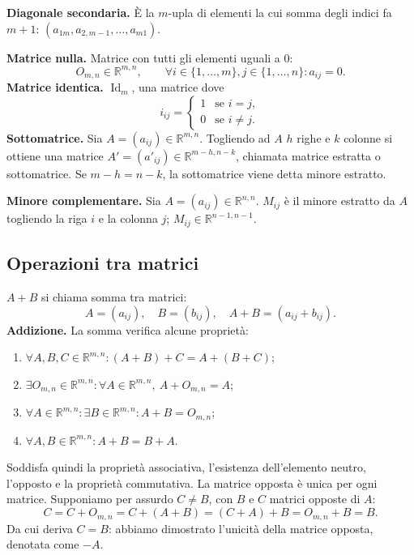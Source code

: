 \documentclass[11pt,a4paper]{article}
\newcommand{\pagina}[1]{\clearpage}
\begin{document}
\textbf{Diagonale secondaria.} È la $m$-upla di elementi la cui somma degli indici fa $m+1$: $(a_{1m},a_{2,m-1},\ldots,a_{m1})$.

\textbf{Matrice nulla.} Matrice con tutti gli elementi uguali a $0$:
\[O_{m,n}\in\mathbb R^{m,n},\qquad\forall i\in\{1,\ldots,m\},j\in\{1,\ldots,n\}:a_{ij}=0.\]
\textbf{Matrice identica.} $\operatorname{Id}_m$, una matrice dove
\[i_{ij}=\begin{cases}1&\text{se }i=j,\\0&\text{se }i\ne j.\end{cases}\]
\textbf{Sottomatrice.} Sia $A=(a_{ij})\in\mathbb R^{m,n}$. Togliendo ad $A$ $h$ righe e $k$ colonne si ottiene una matrice $A'=(a'_{ij})\in\mathbb R^{m-h,n-k}$, chiamata matrice estratta o sottomatrice. Se $m-h=n-k$, la sottomatrice viene detta minore estratto.

\textbf{Minore complementare.} Sia $A=(a_{ij})\in\mathbb R^{n,n}$. $M_{ij}$ è il minore estratto da $A$ togliendo la riga $i$ e la colonna $j$; $M_{ij}\in\mathbb R^{n-1,n-1}$.
\pagina{9}
\subsection*{Operazioni tra matrici}
$A+B$ si chiama somma tra matrici:
\[A=(a_{ij}),\quad B=(b_{ij}),\quad A+B=(a_{ij}+b_{ij}).\]
\textbf{Addizione.} La somma verifica alcune proprietà:
\begin{enumerate}
\item $\forall A,B,C\in\mathbb R^{m,n}: (A+B)+C=A+(B+C)$;
\item $\exists O_{m,n}\in\mathbb R^{m,n}:\forall A\in\mathbb R^{m,n},\ A+O_{m,n}=A$;
\item $\forall A\in\mathbb R^{m,n}:\exists B\in\mathbb R^{m,n}:A+B=O_{m,n}$;
\item $\forall A,B\in\mathbb R^{m,n}:A+B=B+A$.
\end{enumerate}
Soddisfa quindi la proprietà associativa, l'esistenza dell'elemento neutro, l'opposto e la proprietà commutativa.
La matrice opposta è unica per ogni matrice. Supponiamo per assurdo $C\ne B$, con $B$ e $C$ matrici opposte di $A$:
\[C=C+O_{m,n}=C+(A+B)=(C+A)+B=O_{m,n}+B=B.\]
Da cui deriva $C=B$: abbiamo dimostrato l'unicità della matrice opposta, denotata come $-A$.
\end{document}
